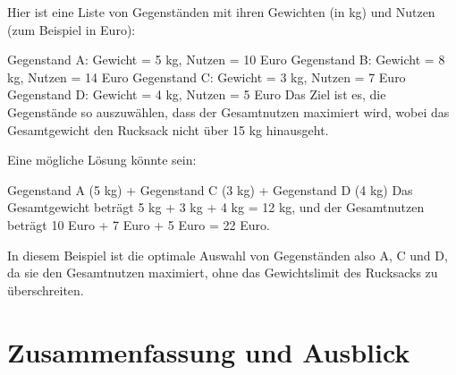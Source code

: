 \documentclass[12pt]{report}
\begin{document}
Hier ist eine Liste von Gegenständen mit ihren Gewichten (in kg) und Nutzen (zum Beispiel in Euro):

Gegenstand A: Gewicht = 5 kg, Nutzen = 10 Euro
Gegenstand B: Gewicht = 8 kg, Nutzen = 14 Euro
Gegenstand C: Gewicht = 3 kg, Nutzen = 7 Euro
Gegenstand D: Gewicht = 4 kg, Nutzen = 5 Euro
Das Ziel ist es, die Gegenstände so auszuwählen, dass der Gesamtnutzen maximiert wird, wobei das Gesamtgewicht den Rucksack nicht über 15 kg hinausgeht.

Eine mögliche Lösung könnte sein:

Gegenstand A (5 kg) + Gegenstand C (3 kg) + Gegenstand D (4 kg)
Das Gesamtgewicht beträgt 5 kg + 3 kg + 4 kg = 12 kg, und der Gesamtnutzen beträgt 10 Euro + 7 Euro + 5 Euro = 22 Euro.

In diesem Beispiel ist die optimale Auswahl von Gegenständen also A, C und D, da sie den Gesamtnutzen maximiert, ohne das Gewichtslimit des Rucksacks zu überschreiten.



\newpage
\chapter{Zusammenfassung und Ausblick}


\newpage
{}
\setcounter{page}{\value{frontmatterPage}} %
\addtocounter{page}{1}

\renewcommand{\refname}{Literaturverzeichnis}


\end{document}
